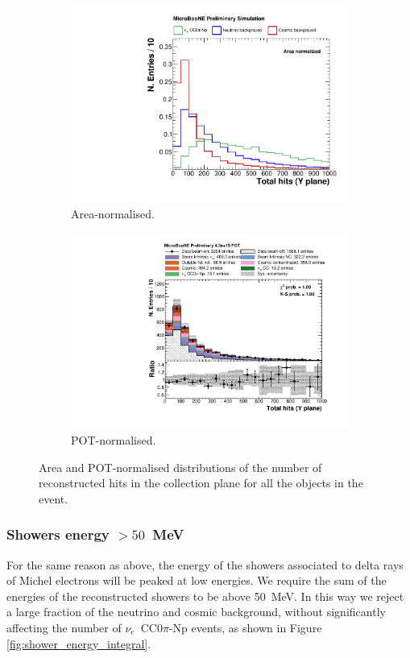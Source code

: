 \begin{figure}[htbp]
\centering
  \begin{subfigure}{0.49\textwidth}
    \includegraphics[width=\linewidth]{figures/h_total_hits_y_norm.pdf}
    \caption{Area-normalised.} \label{fig:nhits_integral}
  \end{subfigure}
    \begin{subfigure}{0.49\textwidth}
    \includegraphics[width=\linewidth]{figures/h_total_hits_y.pdf}
    \caption{POT-normalised.} \label{fig:nhits_pot}
  \end{subfigure}
  \caption{Area and POT-normalised distributions of the number of reconstructed hits in the collection plane for all the objects in the event.}
\end{figure}


\subsubsection*{Showers energy $>50$~MeV} 
For the same reason as above, the energy of the showers associated to delta rays of Michel electrons will be peaked at low energies. We require the sum of the energies of the reconstructed showers to be above 50~MeV. In this way we reject a large fraction of the neutrino and cosmic background, without significantly affecting the number of $\nu_e$~CC0$\pi$-Np events, as shown in Figure \ref{fig:shower_energy_integral}.

